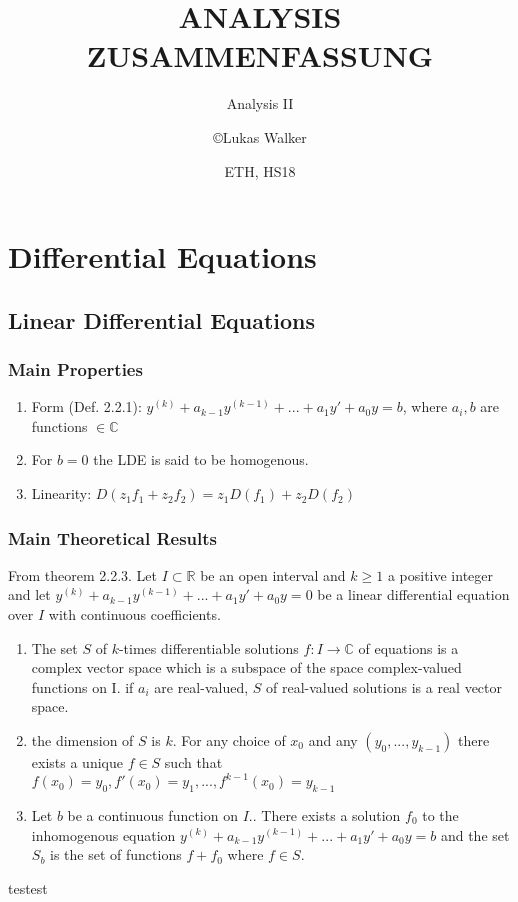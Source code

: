 \documentclass[9pt]{scrartcl}
\title{ANALYSIS ZUSAMMENFASSUNG}
\subtitle{Analysis II}
\author{\copyright Lukas Walker}
\date{ETH, HS18}
\newcommand\R{\mathbb{R}}
\newcommand\C{\mathbb{C}}
\let\stdsection\section
\renewcommand\section{\stdsection}%
\begin{document}
\maketitle
\begin{multicols}{2}
	\tableofcontents
\end{multicols}
	
\twocolumn
\columnseprule 1pt
    
\section{Differential Equations}

\subsection{Linear Differential Equations}
			
    \subsubsection{Main Properties}
    
    \begin{enumerate}
        \item Form (Def. 2.2.1): $y^{(k)} + a_{k-1}y^{(k-1)} + ... + a_{1}y' + a_0y = b$, where $a_i, b$ are functions $\in \C$
        \item For $b=0$ the LDE is said to be homogenous.
        \item Linearity: $D(z_1f_1 + z_2f_2) = z_1D(f_1) + z_2D(f_2)$
    \end{enumerate}
    
    \subsubsection{Main Theoretical Results}
    
    From theorem 2.2.3.
    Let $I\subset \R$ be an open interval and $k \geq 1$ a positive integer and let $y^{(k)} + a_{k-1}y^{(k-1)} + ... + a_1y' + a_0y = 0$ be a linear differential equation over $I$ with continuous coefficients.
    
    \begin{enumerate}
        \item The set $S$ of $k$-times differentiable solutions $f:I \to\C$ of equations is a complex vector space which is a subspace of the space complex-valued functions on I.
        \subitem if $a_i$ are real-valued, $S$ of real-valued solutions is a real vector space.
        \item the dimension of $S$ is $k$. For any choice of $x_0$ and any $(y_0,...,y_{k-1})$ there exists a unique $f\in S$ such that $f(x_0) = y_0, f'(x_0) = y_1, ..., f^{k-1}(x_0) = y_{k-1}$
        \item Let $b$ be a continuous function on $I$.. There exists a solution $f_0$ to the inhomogenous equation $y^(k) + a_{k-1}y^{(k-1)} + ... + a_1y' + a_0y = b$ and the set $S_b$ is the set of functions $f + f_0$ where $f \in S$.
    \end{enumerate}
    testest
    
    
\end{document}
